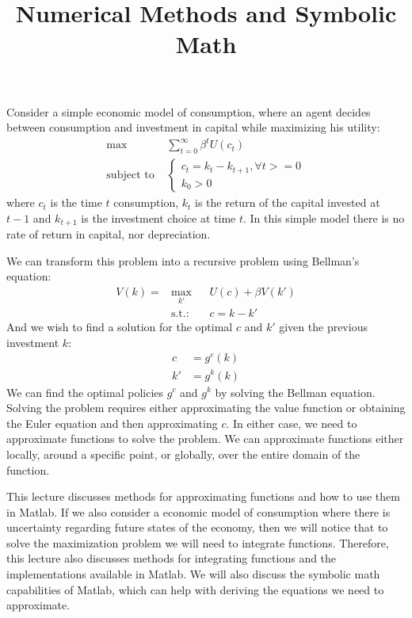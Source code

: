 \documentclass[12pt, a4paper]{article}
\date{}
\title{Numerical Methods and Symbolic Math}
\begin{document}
\maketitle
Consider a simple economic model of consumption, where an agent decides between consumption and investment in capital while maximizing his utility:
\begin{align*}
  \max&\sum_{t=0}^{\infty}\beta^tU(c_t)\\
  \text{subject to }&
                      \begin{cases}
                        c_t = k_t - k_{t+1}, \forall t >= 0\\
                        k_0 > 0
                      \end{cases}
\end{align*}
where \(c_t\) is the time \(t\) consumption, \(k_t\) is the return of the capital invested at \(t-1\) and \(k_{t+1}\) is the investment choice at time \(t\).
In this simple model there is no rate of return in capital, nor depreciation.

We can transform this problem into a recursive problem using Bellman's equation:
\begin{equation*}
\begin{aligned}
V(k) = & \underset{k'}{\text{max}} & & {U(c) + \beta V(k')}\\
& \text{s.t.:} & & c = k - k'
\end{aligned}
\end{equation*}
And we wish to find a solution for the optimal \(c\) and \(k'\) given the previous investment \(k\):
\begin{align*}
c &= g^c(k)\\
k'&= g^k(k)
\end{align*}
We can find the optimal policies \(g^c\) and \(g^k\) by solving the Bellman equation.
Solving the problem requires either approximating the value function or obtaining the Euler equation and then approximating \(c\).
In either case, we need to approximate functions to solve the problem.
We can approximate functions either locally, around a specific point, or globally, over the entire domain of the function.

This lecture discusses methods for approximating functions and how to use them in Matlab.
If we also consider a economic model of consumption where there is uncertainty regarding future states of the economy, then we will notice that to solve the maximization problem we will need to integrate functions.
Therefore, this lecture also discusses methods for integrating functions and the implementations available in Matlab.
We will also discuss the symbolic math capabilities of Matlab, which can help with deriving the equations we need to approximate.
\end{document}
